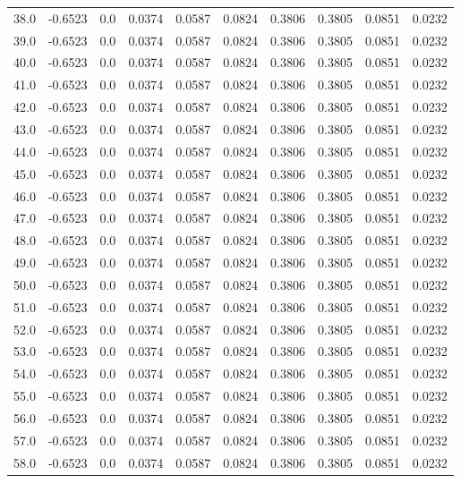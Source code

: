 \begin{longtable}{lrrrrrrrrr}
38.0 & -0.6523 & 0.0 & 0.0374 & 0.0587 & 0.0824 & 0.3806 & 0.3805 & 0.0851 & 0.0232 \\
39.0 & -0.6523 & 0.0 & 0.0374 & 0.0587 & 0.0824 & 0.3806 & 0.3805 & 0.0851 & 0.0232 \\
40.0 & -0.6523 & 0.0 & 0.0374 & 0.0587 & 0.0824 & 0.3806 & 0.3805 & 0.0851 & 0.0232 \\
41.0 & -0.6523 & 0.0 & 0.0374 & 0.0587 & 0.0824 & 0.3806 & 0.3805 & 0.0851 & 0.0232 \\
42.0 & -0.6523 & 0.0 & 0.0374 & 0.0587 & 0.0824 & 0.3806 & 0.3805 & 0.0851 & 0.0232 \\
43.0 & -0.6523 & 0.0 & 0.0374 & 0.0587 & 0.0824 & 0.3806 & 0.3805 & 0.0851 & 0.0232 \\
44.0 & -0.6523 & 0.0 & 0.0374 & 0.0587 & 0.0824 & 0.3806 & 0.3805 & 0.0851 & 0.0232 \\
45.0 & -0.6523 & 0.0 & 0.0374 & 0.0587 & 0.0824 & 0.3806 & 0.3805 & 0.0851 & 0.0232 \\
46.0 & -0.6523 & 0.0 & 0.0374 & 0.0587 & 0.0824 & 0.3806 & 0.3805 & 0.0851 & 0.0232 \\
47.0 & -0.6523 & 0.0 & 0.0374 & 0.0587 & 0.0824 & 0.3806 & 0.3805 & 0.0851 & 0.0232 \\
48.0 & -0.6523 & 0.0 & 0.0374 & 0.0587 & 0.0824 & 0.3806 & 0.3805 & 0.0851 & 0.0232 \\
49.0 & -0.6523 & 0.0 & 0.0374 & 0.0587 & 0.0824 & 0.3806 & 0.3805 & 0.0851 & 0.0232 \\
50.0 & -0.6523 & 0.0 & 0.0374 & 0.0587 & 0.0824 & 0.3806 & 0.3805 & 0.0851 & 0.0232 \\
51.0 & -0.6523 & 0.0 & 0.0374 & 0.0587 & 0.0824 & 0.3806 & 0.3805 & 0.0851 & 0.0232 \\
52.0 & -0.6523 & 0.0 & 0.0374 & 0.0587 & 0.0824 & 0.3806 & 0.3805 & 0.0851 & 0.0232 \\
53.0 & -0.6523 & 0.0 & 0.0374 & 0.0587 & 0.0824 & 0.3806 & 0.3805 & 0.0851 & 0.0232 \\
54.0 & -0.6523 & 0.0 & 0.0374 & 0.0587 & 0.0824 & 0.3806 & 0.3805 & 0.0851 & 0.0232 \\
55.0 & -0.6523 & 0.0 & 0.0374 & 0.0587 & 0.0824 & 0.3806 & 0.3805 & 0.0851 & 0.0232 \\
56.0 & -0.6523 & 0.0 & 0.0374 & 0.0587 & 0.0824 & 0.3806 & 0.3805 & 0.0851 & 0.0232 \\
57.0 & -0.6523 & 0.0 & 0.0374 & 0.0587 & 0.0824 & 0.3806 & 0.3805 & 0.0851 & 0.0232 \\
58.0 & -0.6523 & 0.0 & 0.0374 & 0.0587 & 0.0824 & 0.3806 & 0.3805 & 0.0851 & 0.0232 \\

\end{longtable}
